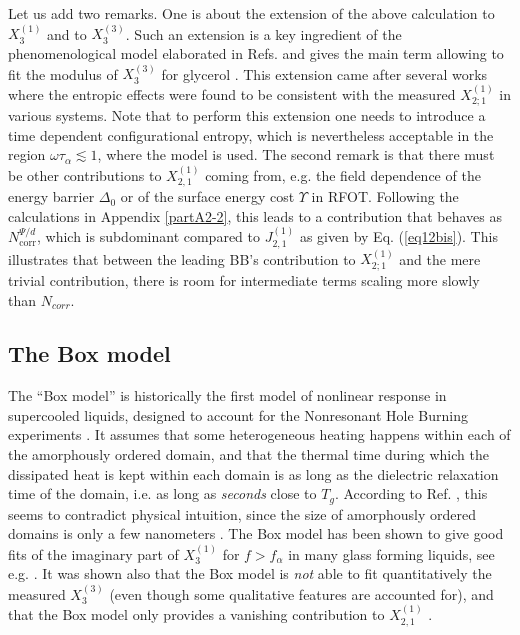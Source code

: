 \documentclass[single column,pre]{revtex4}
\begin{document}
Let us add two remarks. One is about the extension of the above calculation to $X_3^{(1)}$ and to $X_3^{(3)}$. Such an extension is a key ingredient of the phenomenological model elaborated in Refs. \cite{Ric16a,Ric16b} and gives the main term allowing to fit the modulus of $X_3^{(3)}$ for glycerol \cite{Ric16b}. This extension came after several works \cite{Sam15,You15,Rie15,Sam16b} where the entropic effects were found to be consistent with the measured $X_{2;1}^{(1)}$ in various systems. Note that to perform this extension one needs to introduce a time dependent configurational entropy, which is nevertheless acceptable in the region $\omega \tau_{\alpha} \lesssim 1$, where the model is used. The second remark is that there must be other contributions to $X_{2,1}^{(1)}$ coming from, e.g. the field dependence of the energy barrier $\Delta_0$ or of the surface energy cost $\Upsilon$ in RFOT. Following the calculations in Appendix \ref{partA2-2}, this leads to a contribution that behaves as $N_{\text{corr}}^{\Psi/d}$, which is subdominant compared to $J_{2,1}^{(1)}$ as given by Eq. (\ref{eq12bis}). 
This illustrates that between the leading BB's contribution to $X_{2;1}^{(1)}$ and the mere trivial contribution, there is room for intermediate terms scaling more slowly than $N_{corr}$.


\subsection{\label{part4-2} The Box model}

The ``Box model'' is historically the first model of nonlinear response in supercooled liquids, designed to account for the Nonresonant Hole Burning experiments \cite{Sch96}. It 
assumes \cite{Sch96,Ric06,Wei07,Wan07,Kha11} that some heterogeneous heating happens within each of the amorphously ordered domain, and that the thermal time during 
which the dissipated heat is kept within each domain is as long as the dielectric relaxation time of the domain, i.e.  as long as \textit{seconds} close to $T_g$. According to Ref. \cite{Buc16b}, this seems to contradict physical intuition, since the size of amorphously ordered domains is only a few nanometers \cite{note10}. The Box model has been shown to give good fits of the imaginary part of $X_3^{(1)}$ for $f > f_{\alpha}$ in many glass forming liquids, see e.g. \cite{Ric06,Wei07,Wan07,Kha11}. It was shown also \cite{Bru11b} that the Box model is \textit{not} able to 
fit quantitatively the measured $X_3^{(3)}$ (even though some qualitative features are accounted for), and that the Box model only provides a vanishing contribution to $X_{2,1}^{(1)}$  \cite{Lho14}.
\end{document}
